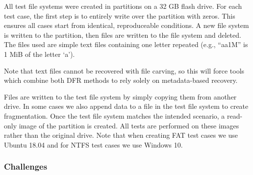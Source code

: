 \begin{paraphrase}
 All test file systems were created in partitions on a 32 GB flash drive. For each test case, the first step is to entirely write over the partition with zeros. This ensures all cases start from identical, reproduceable conditions. A new file system is written to the partition, then files are written to the file system and deleted. The files used are simple text files containing one letter repeated (e.g., ``aa1M'' is 1 MiB of the letter `a').
 \end{paraphrase}
 Note that text files cannot be recovered with file carving, so this will force tools which combine both DFR methods to rely solely on metadata-based recovery.
 \begin{paraphrase}
 Files are written to the test file system by simply copying them from another drive. In some cases we also append data to a file in the test file system to create fragmentation. Once the test file system matches the intended scenario, a read-only image of the partition is created. All tests are performed on these images rather than the original drive. Note that when creating FAT test cases we use Ubuntu 18.04 and for NTFS test cases we use Windows 10.
\end{paraphrase}

\subsubsection{Challenges}

